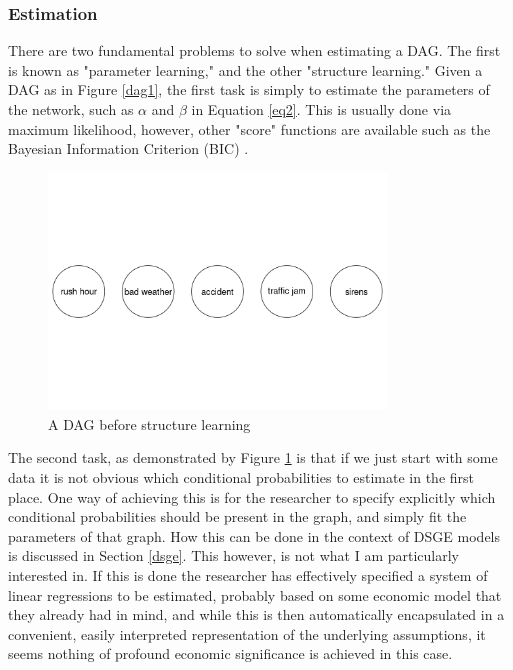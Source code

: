 \documentclass{article}
\begin{document}
\subsubsection{Estimation} \label{estimation}

There are two fundamental problems to solve when estimating a DAG. The first is known as "parameter learning," and the other "structure learning." Given a DAG as in Figure \ref{dag1}, the first task is simply to estimate the parameters of the network, such as $\alpha$ and $\beta$ in Equation \ref{eq2}. This is usually done via maximum likelihood, however, other "score" functions are available such as the Bayesian Information Criterion (BIC) \parencite{chen1998speaker}.

\begin{figure}
  \centering
  \includegraphics[width=0.8\textwidth]{images/trafficjam_unfit.png}
  \caption{A DAG before structure learning}
  \label{dag2}
\end{figure}

The second task, as demonstrated by Figure \ref{dag2} is that if we just start with some data it is not obvious which conditional probabilities to estimate in the first place. One way of achieving this is for the researcher to specify explicitly which conditional probabilities should be present in the graph, and simply fit the parameters of that graph. How this can be done in the context of DSGE models is discussed in Section \ref{dsge}. This however, is not what I am particularly interested in. If this is done the researcher has effectively specified a system of linear regressions to be estimated, probably based on some economic model that they already had in mind, and while this is then automatically encapsulated in a convenient, easily interpreted representation of the underlying assumptions, it seems nothing of profound economic significance is achieved in this case. 
\end{document}
